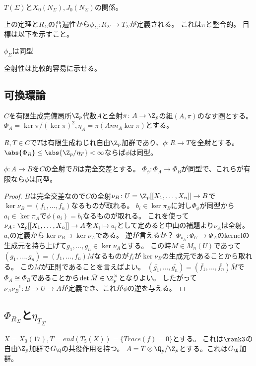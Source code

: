 \documentclass{jsarticle}
\begin{document}
$T(\Sigma)$と$X_0(N_\Sigma), J_0(N_\Sigma)$の関係。

上の定理と$R_\Sigma$の普遍性から$\phi_\Sigma\colon R_\Sigma\to T_\Sigma$が定義される。
これは$\pi$と整合的。
目標は以下を示すこと。
\begin{thm}
$\phi_\Sigma$は同型
\end{thm}

全射性は比較的容易に示せる。

\subsection{可換環論}
$C$を有限生成完備局所$\Z_p$代数$A$と全射$\pi\colon A\to\Z_p$の組$(A,\pi)$のなす圏とする。
$\Phi_A=\ker\pi/(\ker\pi)^2, \eta_A=\pi(Ann_A\ker\pi)$とする。
\begin{thm}
$R, T\in C$で$T$は有限生成ねじれ自由$\Z_p$加群であり、$\phi\colon R\to T$を全射とする。
$\abs{\Phi_R}\leq\abs{\Z_p/\eta_T}<\infty$ならば$\phi$は同型。
\end{thm}

\begin{thm}
$\phi\colon A\to B$を$C$の全射で$B$は完全交差とする。
$\Phi_\phi\colon\Phi_A\to\Phi_B$が同型で、これらが有限なら$\phi$は同型。
\end{thm}
\begin{proof}
$B$は完全交差なので$C$の全射$\nu_B\colon U=\Z_p[[X_1,\ldots,X_n]]\to B$で$\ker\nu_B=(f_1,\ldots,f_n)$なるものが取れる。
$b_i\in\ker\pi_B$に対し$\Phi_\phi$が同型から$a_i\in\ker\pi_A$で$\phi(a_i)=b_i$なるものが取れる。
これを使って$\nu_A\colon\Z_p[[X_1,\ldots,X_n]]\to A$を$X_i\mapsto a_i$として定めると中山の補題より$\nu_A$は全射。
$a_i$の定義から$\ker\nu_B\supset\ker\nu_A$である。
逆が言えるか？
$\Phi_{\nu_A}\colon\Phi_U\to\Phi_A$のkernelの生成元を持ち上げて$g_1,\ldots,g_n\in\ker\nu_A$とする。
この時$M\in M_n(U)$であって$(g_1,\ldots,g_n)=(f_1,\ldots,f_n)M$なるものが$f_i$が$\ker\nu_B$の生成元であることから取れる。
この$M$が正則であることを言えばよい。
$(\bar{g_1},\ldots,\bar{g_n})=(\bar{f_1},\ldots,\bar{f_n})\bar{M}$で$\Phi_A\cong\Phi_B$であることから$\det\bar{M}\in\Z_p^\times$となりよい。
したがって$\nu_A\nu_B^{-1}\colon B\to U\to A$が定義でき、これが$\phi$の逆を与える。
\end{proof}

\subsection{$\Phi_{R_\Sigma}$と$\eta_{T_\Sigma}$}
$X=X_0(17), T=end(T_5(X))=\{Trace(f)=0\}$とする。
これは$\rank 3$の自由$\Z_p$加群で$G_\Q$の共役作用を持つ。
$A=T\otimes\Q_p/\Z_p$とする。これは$G_\Q$加群。
\end{document}
